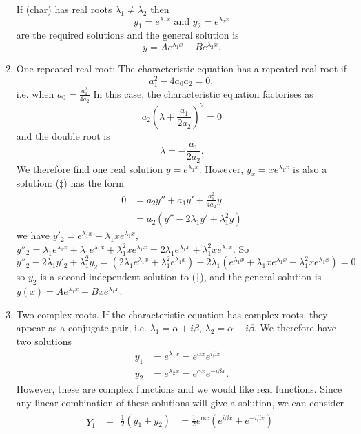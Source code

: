 \documentclass[10pt, a4paper]{article}
\begin{document}
\begin{enumerate}[label = \roman*)]
    If (char) has real roots $\lambda_1 \neq \lambda_2$ then
    \[
    y_1 = e ^ {\lambda_1x}\text{ and } y_2 = e ^ {\lambda_2x}
    \]
    are the required solutions and the general solution is
    \[
    y = Ae ^ {\lambda_1x} + Be ^ {\lambda_2x}.
    \]
    \item One repeated real root:
    The characteristic equation has a repeated real root if
    \[
    a_1 ^ 2 - 4a_0a_2 = 0,
    \]
    i.e. when $a_0 = \frac{a_1 ^ 2}{4a_2}$
    In this case,
    the characteristic equation factorises as
    \[
    a_2\left(\lambda + \frac{a_1}{2a_2}\right) ^ 2 = 0
    \]
    and the double root is
    \[
    \lambda = -\frac{a_1}{2a_2}.
    \]
    We therefore find one real solution $y = e ^ {\lambda_1x}$.
    However,
    $y_x = xe ^ {\lambda_1x}$ is also a solution:
    ($\ddagger$) has the form
    \begin{align*}
        0 &= a_2y'' + a_1y' + \frac{a_1 ^ 2}{4a_2}y \\
        &= a_2(y'' - 2\lambda_1y' + \lambda_1 ^ 2y)
    \end{align*}
    we have $y'_2 = e ^ {\lambda_1x} + \lambda_1xe ^ {\lambda_1x}$,
    $y''_2 = \lambda_1e ^ {\lambda_1x} + \lambda_1e ^ {\lambda_1x} + \lambda_1 ^ 2xe ^ {\lambda_1x} = 2\lambda_1e ^ {\lambda_1x} + \lambda_1 ^ 2xe ^ {\lambda_1x}$.
    So
    \[
    y''_2 - 2\lambda_1y'_2 + \lambda_1 ^ 2y_2 = (2\lambda_1e ^ {\lambda_1x} + \lambda_1 ^ 2e ^ {\lambda_1x}) - 2\lambda_1(e ^ {\lambda_1x} + \lambda_1xe ^ {\lambda_1x} + \lambda_1 ^ 2xe ^ {\lambda_1x}) = 0
    \]
    so $y_2$ is a second independent solution to ($\ddagger$),
    and the general solution is $y(x) = Ae ^ {\lambda_1x} + Bxe ^ {\lambda_1x}$.
    \item Two complex roots.
    If the characteristic equation has complex roots,
    they appear as a conjugate pair,
    i.e. $\lambda_1 = \alpha + i\beta$, $\lambda_2 = \alpha - i\beta$.
    We therefore have two solutions
    \begin{align*}
        y_1 &= e ^ {\lambda_1x} = e ^ {\alpha x}e ^ {i\beta x} \\
        y_2 &= e ^ {\lambda_2x} = e ^ {\alpha x}e ^ {-i\beta x}.
    \end{align*}
    However,
    these are complex functions and we would like real functions.
    Since any linear combination of these solutions will give a solution,
    we can consider
    \begin{align*}
        Y_1 &=
        \begin{aligned}
            \frac{1}{2}(y_1 + y_2) &= \frac{1}{2}e ^ {\alpha x}(e ^ {i\beta x} + e ^ {-i\beta x}) \\

\end{aligned}
\end{align*}
\end{enumerate}
\end{document}
